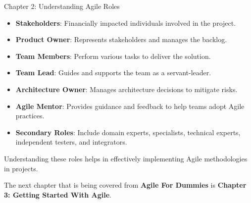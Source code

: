 \begin{notes}{Chapter 2: Understanding Agile Roles}
\begin{highlight}
        \begin{itemize}
            \item \textbf{Stakeholders}: Financially impacted individuals involved in the project.
            \item \textbf{Product Owner}: Represents stakeholders and manages the backlog.
            \item \textbf{Team Members}: Perform various tasks to deliver the solution.
            \item \textbf{Team Lead}: Guides and supports the team as a servant-leader.
            \item \textbf{Architecture Owner}: Manages architecture decisions to mitigate risks.
            \item \textbf{Agile Mentor}: Provides guidance and feedback to help teams adopt Agile practices.
            \item \textbf{Secondary Roles}: Include domain experts, specialists, technical experts, independent testers, and integrators.
        \end{itemize}
        
        Understanding these roles helps in effectively implementing Agile methodologies in projects.
    
    \end{highlight}
\end{notes}

The next chapter that is being covered from \textbf{Agile For Dummies} is \textbf{Chapter 3: Getting Started With Agile}.


